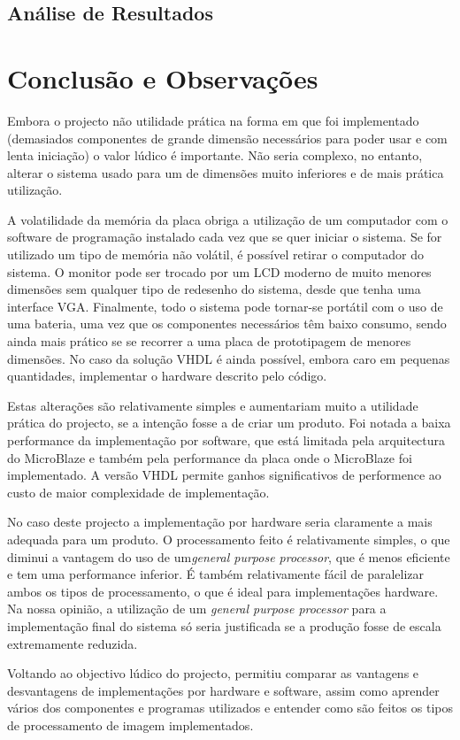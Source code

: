 \documentclass[a4paper,12pt]{article}
\begin{document}



\subsection{Análise de Resultados}

\section{Conclusão e Observações}
Embora o projecto não utilidade prática na forma em que foi implementado (demasiados componentes de grande dimensão necessários para poder usar e com lenta iniciação) o valor lúdico é importante. Não seria complexo, no entanto, alterar o sistema usado para um de dimensões muito inferiores e de mais prática utilização. 

A volatilidade da memória da placa obriga a utilização de um computador com o software de programação instalado cada vez que se quer iniciar o sistema. Se for utilizado um tipo de memória não volátil, é possível retirar o computador do sistema. O monitor pode ser trocado por um LCD moderno de muito menores dimensões sem qualquer tipo de redesenho do sistema, desde que tenha uma interface VGA. Finalmente, todo o sistema pode tornar-se portátil com o uso de uma bateria, uma vez que os componentes necessários têm baixo consumo, sendo ainda mais prático se se recorrer a uma placa de prototipagem de menores dimensões. No caso da solução VHDL é ainda possível, embora caro em pequenas quantidades, implementar o hardware descrito pelo código. 

Estas alterações são relativamente simples e aumentariam muito a utilidade prática do projecto, se a intenção fosse a de criar um produto. 
Foi notada a baixa performance da implementação por software, que está limitada pela arquitectura do MicroBlaze e também pela performance da placa onde o MicroBlaze foi implementado. A versão VHDL permite ganhos significativos de performence ao custo de maior complexidade de implementação.   

No caso deste projecto a implementação por hardware seria claramente a mais adequada para um produto. O processamento feito é relativamente simples, o que diminui a vantagem do uso de um\textit{general purpose processor}, que é menos eficiente e tem uma performance inferior. É também relativamente fácil de paralelizar ambos os tipos de processamento, o que é ideal para implementações hardware. Na nossa opinião, a utilização de um \textit{general purpose processor} para a implementação final do sistema só seria justificada se a produção fosse de escala extremamente reduzida.

Voltando ao objectivo lúdico do projecto, permitiu comparar as vantagens e desvantagens de implementações por hardware e software, assim como aprender vários dos componentes e programas utilizados e entender como são feitos os tipos de processamento de imagem implementados. 



\nocite{labsECom}
\end{document}
